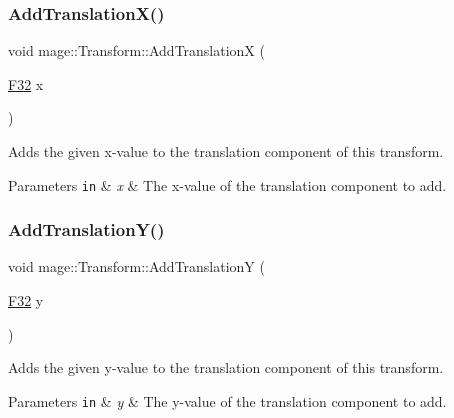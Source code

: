\subsubsection{\texorpdfstring{Add\+Translation\+X()}{AddTranslationX()}}
{\footnotesize\ttfamily void mage\+::\+Transform\+::\+Add\+TranslationX (\begin{DoxyParamCaption}\item[{\hyperlink{namespacemage_aa97e833b45f06d60a0a9c4fc22ae02c0}{F32}}]{x }\end{DoxyParamCaption})\hspace{0.3cm}{\ttfamily [noexcept]}}

Adds the given x-\/value to the translation component of this transform.


\begin{DoxyParams}[1]{Parameters}
\mbox{\tt in}  & {\em x} & The x-\/value of the translation component to add. \\
\hline
\end{DoxyParams}
\hypertarget{structmage_1_1_transform_abf9253ddafad2725ef6c6e2b4bd44b35}{}\label{structmage_1_1_transform_abf9253ddafad2725ef6c6e2b4bd44b35} 
\subsubsection{\texorpdfstring{Add\+Translation\+Y()}{AddTranslationY()}}
{\footnotesize\ttfamily void mage\+::\+Transform\+::\+Add\+TranslationY (\begin{DoxyParamCaption}\item[{\hyperlink{namespacemage_aa97e833b45f06d60a0a9c4fc22ae02c0}{F32}}]{y }\end{DoxyParamCaption})\hspace{0.3cm}{\ttfamily [noexcept]}}

Adds the given y-\/value to the translation component of this transform.


\begin{DoxyParams}[1]{Parameters}
\mbox{\tt in}  & {\em y} & The y-\/value of the translation component to add. \\
\hline
\end{DoxyParams}
\hypertarget{structmage_1_1_transform_a2554a3af167bb8ae9f4724921e6a3596}{}\label{structmage_1_1_transform_a2554a3af167bb8ae9f4724921e6a3596} 
